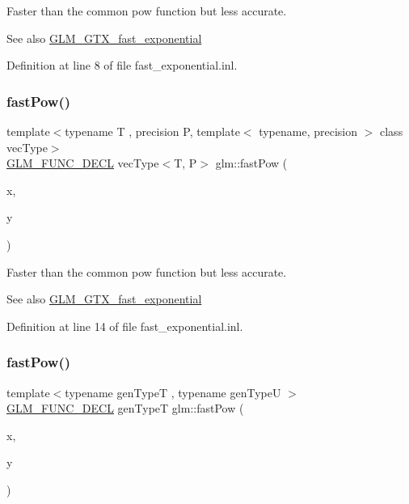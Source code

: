 Faster than the common pow function but less accurate. \begin{DoxySeeAlso}{See also}
\mbox{\hyperlink{group__gtx__fast__exponential}{G\+L\+M\+\_\+\+G\+T\+X\+\_\+fast\+\_\+exponential}} 
\end{DoxySeeAlso}


Definition at line 8 of file fast\+\_\+exponential.\+inl.

\mbox{\label{group__gtx__fast__exponential_ga07b73976a9af4005945bc338b45d8466}} 
\subsubsection{\texorpdfstring{fastPow()}{fastPow()}\hspace{0.1cm}{\footnotesize\ttfamily [2/4]}}
{\footnotesize\ttfamily template$<$typename T , precision P, template$<$ typename, precision $>$ class vec\+Type$>$ \\
\mbox{\hyperlink{setup_8hpp_ab2d052de21a70539923e9bcbf6e83a51}{G\+L\+M\+\_\+\+F\+U\+N\+C\+\_\+\+D\+E\+CL}} vec\+Type$<$T, P$>$ glm\+::fast\+Pow (\begin{DoxyParamCaption}\item[{vec\+Type$<$ T, P $>$ const \&}]{x,  }\item[{vec\+Type$<$ T, P $>$ const \&}]{y }\end{DoxyParamCaption})}

Faster than the common pow function but less accurate. \begin{DoxySeeAlso}{See also}
\mbox{\hyperlink{group__gtx__fast__exponential}{G\+L\+M\+\_\+\+G\+T\+X\+\_\+fast\+\_\+exponential}} 
\end{DoxySeeAlso}


Definition at line 14 of file fast\+\_\+exponential.\+inl.

\mbox{\label{group__gtx__fast__exponential_ga7f2562db9c3e02ae76169c36b086c3f6}} 
\subsubsection{\texorpdfstring{fastPow()}{fastPow()}\hspace{0.1cm}{\footnotesize\ttfamily [3/4]}}
{\footnotesize\ttfamily template$<$typename gen\+TypeT , typename gen\+TypeU $>$ \\
\mbox{\hyperlink{setup_8hpp_ab2d052de21a70539923e9bcbf6e83a51}{G\+L\+M\+\_\+\+F\+U\+N\+C\+\_\+\+D\+E\+CL}} gen\+TypeT glm\+::fast\+Pow (\begin{DoxyParamCaption}\item[{gen\+TypeT}]{x,  }\item[{gen\+TypeU}]{y }\end{DoxyParamCaption})}

